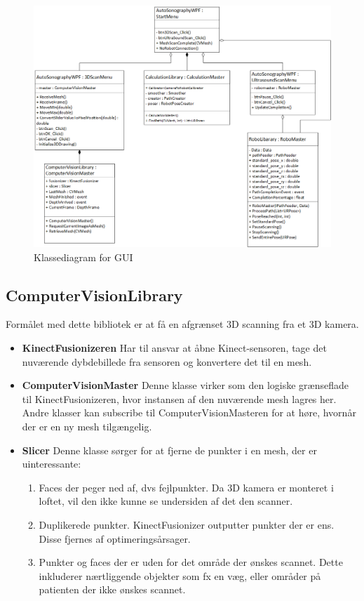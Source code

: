 \begin{figure}[H]
    \centering
    \includegraphics[width=1\textwidth]{figurer/d/Design/Class/uml_class_gui}
    \caption{Klassediagram for GUI}
    \label{class_gui}
\end{figure}
\newpage

\subsection{ComputerVisionLibrary} \label{ComputerVisionLibrary}
Formålet med dette bibliotek er at få en afgrænset 3D scanning fra et 3D kamera.

\begin{itemize}
\item{\textbf{KinectFusionizeren}}\newline
Har til ansvar at åbne Kinect-sensoren, tage det nuværende dybdebillede fra sensoren og konvertere det til en mesh.

\item{\textbf{ComputerVisionMaster}}\newline
Denne klasse virker som den logiske grænseflade til KinectFusionizeren, hvor instansen af den nuværende mesh lagres her.
Andre klasser kan subscribe til ComputerVisionMasteren for at høre, hvornår der er en ny mesh tilgængelig.

\item{\textbf{Slicer}}\newline
Denne klasse sørger for at fjerne de punkter i en mesh, der er uinteressante:
\begin{enumerate}
\item{Faces der peger ned af, dvs fejlpunkter. Da 3D kamera er monteret i loftet, vil den ikke kunne se undersiden af det den scanner.}
\item{Duplikerede punkter. KinectFusionizer outputter punkter der er ens. Disse fjernes af optimeringsårsager.}
\item{Punkter og faces der er uden for det område der ønskes scannet. Dette inkluderer nærtliggende objekter som fx en væg, eller områder på patienten der ikke ønskes scannet.}
\end{enumerate}
\end{itemize}

